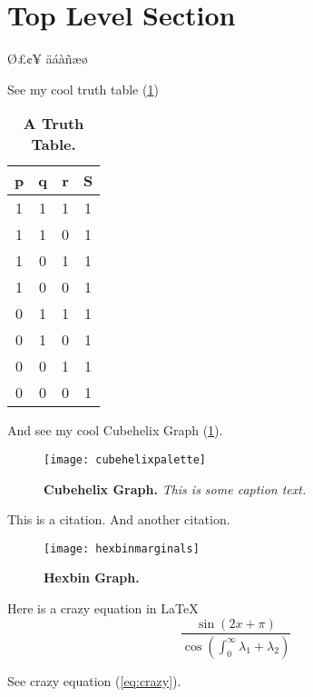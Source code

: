 \section{Top Level Section}
\blindmathtrue
\blindtext

Ø£¢¥
äáàñæø

See my cool truth table (\ref{tab:truthy})

\begin{table} [h!]
\centering
\begin{minipage}{5cm}
\caption[Table \thetable. Truth Table]{ \textbf{A Truth Table.} } 
\begin{tabular} {c c c | c}
p & q & r & S\\ \hline
1 & 1 & 1 & 1\\
1 & 1 & 0 & 1\\
1 & 0 & 1 & 1\\
1 & 0 & 0 & 1\\
0 & 1 & 1 & 1\\
0 & 1 & 0 & 1\\
0 & 0 & 1 & 1\\
0 & 0 & 0 & 1\\
\end{tabular}
\label{tab:truthy}
\end{minipage}
\end{table}

\blindtext

And see my cool Cubehelix Graph (\ref{fig:cubehelix}).

\begin{figure}[!ht]
	\centering
	\begin{minipage}{10cm}
	\texttt{[image: cubehelixpalette]}
	\caption[Figure \thefigure. Cubehelix Graph]{ \textbf{Cubehelix Graph.} \textit{This is some caption text.}}
	\label{fig:cubehelix}
	\end{minipage}
\end{figure}

This is a citation\cite[chapter, p.~15]{greenwade93}.
And another citation\cite{goossens93}.

\begin{figure}[!ht]
	\centering
	\begin{minipage}{10cm}
	\texttt{[image: hexbinmarginals]}
	\caption[Figure \thefigure. Hexbin Marginal Graph]{ \textbf{Hexbin Graph.} }
	\label{fig:hexbin}
	\end{minipage}
\end{figure}

Here is a crazy equation in \LaTeX
\begin{equation} \label{eq:crazy}
	\frac{\sin(2x + \pi)}{\cos(\int_0^\infty{\lambda_1 + \lambda_2})}
\end{equation}

See crazy equation (\ref{eq:crazy}).

